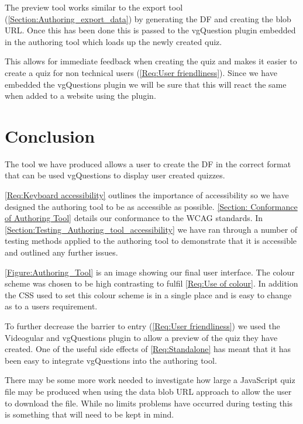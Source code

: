 The preview tool works similar to the export tool (\autoref{Section:Authoring_export_data}) by generating the \gls{DF} and creating the blob URL. Once this has been done this is passed to the vgQuestion plugin embedded in the authoring tool which loads up the newly created quiz.

This allows for immediate feedback when creating the quiz and makes it easier to create a quiz for non technical users (\cref{Req:User friendliness}). Since we have embedded the vgQuestions plugin we will be sure that this will react the same when added to a website using the plugin.

\section{Conclusion}
\label{Section:Authoring_Conclusion}

The tool we have produced allows a user to create the \gls{DF} in the correct format that can be used vgQuestions to display user created quizzes.

\cref{Req:Keyboard accessibility} outlines the importance of accessibility so we have designed the authoring tool to be as accessible as possible. \autoref{Section: Conformance of Authoring Tool} details our conformance to the \gls{WCAG} standards. In \autoref{Section:Testing_Authoring_tool_accessibility} we have ran through a number of testing methods applied to the authoring tool to demonstrate that it is accessible and outlined any further issues.

\autoref{Figure:Authoring_Tool} is an image showing our final user interface. The colour scheme was chosen to be high contrasting to fulfil \cref{Req:Use of colour}. In addition the CSS used to set this colour scheme is in a single place and is easy to change as to a users requirement.

To further decrease the barrier to entry (\cref{Req:User friendliness}) we used the \gls{Videogular} and \gls{vgQuestions} plugin to allow a preview of the quiz they have created. One of the useful side effects of \cref{Req:Standalone} has meant that it has been easy to integrate \gls{vgQuestions} into the authoring tool.

There may be some more work needed to investigate how large a JavaScript quiz file may be produced when using the data blob URL approach to allow the user to download the file. While no limits problems have occurred during testing this is something that will need to be kept in mind. 

